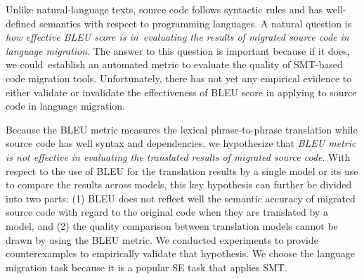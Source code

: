 Unlike natural-language texts, source code follows syntactic rules and
has well-defined semantics with respect to programming languages. A
natural question is {\em how effective BLEU score is in~evaluating the
  results of migrated source code in language migration}. The answer
to this question is important because if it does, we could~establish
an automated metric to evaluate the quality of SMT-based code
migration tools.
Unfortunately, there has not yet
any empirical evidence to either validate or invalidate the
effectiveness of BLEU score in applying to source code in language
migration.

Because the BLEU metric measures the lexical phrase-to-phrase translation
while source code has well syntax and dependencies, we hypothesize that
{\em BLEU metric is not effective in evaluating the translated results of
migrated source code}. With respect to the use of BLEU
for the translation results by a single model or its use to compare
the results across models, this key hypothesis can further be divided
into two parts: (1) BLEU does not reflect well the semantic accuracy
of migrated source code with regard to the original code when they are
translated by a model, and (2) the quality comparison between translation 
models cannot be drawn by using the BLEU metric.
%
We conducted experiments to provide counterexamples to empirically
validate that hypothesis. We choose the language migration task
because it is a popular SE task that applies SMT.

